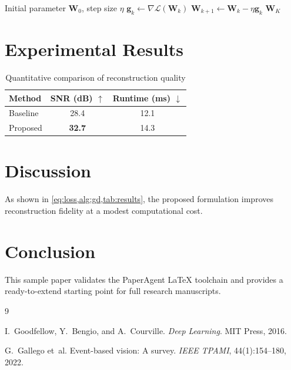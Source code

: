 \documentclass[11pt,a4paper]{article}
\begin{document}
\begin{algorithm}[h]
\caption{Gradient Descent Optimization}
\label{alg:gd}
\begin{algorithmic}[1]
\Require Initial parameter $\bm{W}_0$, step size $\eta$
  \State $\bm{g}_k \gets \nabla \mathcal{L}(\bm{W}_k)$
  \State $\bm{W}_{k+1} \gets \bm{W}_k - \eta \bm{g}_k$
\EndFor
\State \Return $\bm{W}_K$
\end{algorithmic}
\end{algorithm}

\section{Experimental Results}

\begin{table}[h]
\centering
\caption{Quantitative comparison of reconstruction quality}
\label{tab:results}
\begin{tabular}{lcc}
\toprule
Method & SNR (dB) $\uparrow$ & Runtime (ms) $\downarrow$ \\
\midrule
Baseline & 28.4 & 12.1 \\
Proposed & \textbf{32.7} & 14.3 \\
\bottomrule
\end{tabular}
\end{table}

\section{Discussion}

As shown in \cref{eq:loss,alg:gd,tab:results}, the proposed formulation improves
reconstruction fidelity at a modest computational cost.

\section{Conclusion}

This sample paper validates the PaperAgent \LaTeX{} toolchain and provides a
ready-to-extend starting point for full research manuscripts.

\printglossaries


\begin{thebibliography}{9}

I.~Goodfellow, Y.~Bengio, and A.~Courville.
\newblock \emph{Deep Learning}.
\newblock MIT Press, 2016.

G.~Gallego et~al.
\newblock Event-based vision: A survey.
\newblock \emph{IEEE TPAMI}, 44(1):154--180, 2022.

\end{thebibliography}
\end{document}
